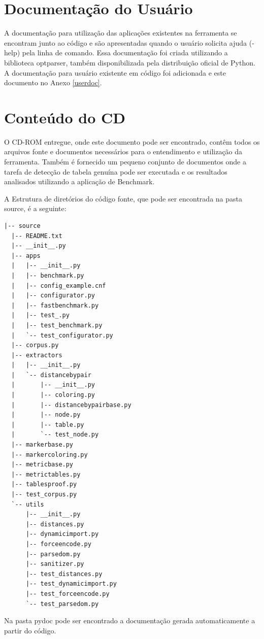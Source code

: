 \documentclass[12pt, a4paper]{article}
\begin{document}
\section{Documentação do Usuário}

A documentação para utilização das aplicações existentes na ferramenta
se encontram junto ao código e são apresentadas quando o usuário
solicita ajuda (-help) pela linha de comando. Essa documentação foi
criada utilizando a biblioteca optparser, também disponibilizada pela
distribuição oficial de Python. A documentação para usuário existente em
código foi adicionada e este documento no Anexo \ref{userdoc}.


\section{Conteúdo do CD}

O CD-ROM entregue, onde este documento pode ser encontrado, contêm
todos os arquivos fonte e documentos necessários para o entendimento e
utilização da ferramenta. Também é fornecido um pequeno conjunto de
documentos onde a tarefa de detecção de tabela genuína pode ser
executada e os resultados analisados utilizando a aplicação de Benchmark.

A Estrutura de diretórios do código fonte, que pode ser encontrada na
pasta source, é a seguinte:

\begin{verbatim}
|-- source
  |-- README.txt 
  |-- __init__.py
  |-- apps
  |   |-- __init__.py
  |   |-- benchmark.py
  |   |-- config_example.cnf
  |   |-- configurator.py
  |   |-- fastbenchmark.py
  |   |-- test_.py
  |   |-- test_benchmark.py
  |   `-- test_configurator.py
  |-- corpus.py
  |-- extractors
  |   |-- __init__.py
  |   `-- distancebypair
  |       |-- __init__.py
  |       |-- coloring.py
  |       |-- distancebypairbase.py
  |       |-- node.py
  |       |-- table.py
  |       `-- test_node.py
  |-- markerbase.py
  |-- markercoloring.py
  |-- metricbase.py
  |-- metrictables.py
  |-- tablesproof.py
  |-- test_corpus.py
  `-- utils
      |-- __init__.py
      |-- distances.py
      |-- dynamicimport.py
      |-- forceencode.py
      |-- parsedom.py
      |-- sanitizer.py
      |-- test_distances.py
      |-- test_dynamicimport.py
      |-- test_forceencode.py
      `-- test_parsedom.py
\end{verbatim}

Na pasta pydoc pode ser encontrado a documentação gerada automaticamente
a partir do código.
\end{document}
